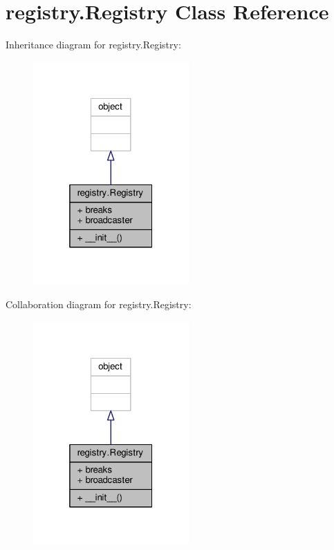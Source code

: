 \hypertarget{classregistry_1_1Registry}{}\section{registry.\+Registry Class Reference}
\label{classregistry_1_1Registry}


Inheritance diagram for registry.\+Registry\+:\nopagebreak
\begin{figure}[H]
\begin{center}
\leavevmode
\includegraphics[width=169pt]{classregistry_1_1Registry__inherit__graph}
\end{center}
\end{figure}


Collaboration diagram for registry.\+Registry\+:\nopagebreak
\begin{figure}[H]
\begin{center}
\leavevmode
\includegraphics[width=169pt]{classregistry_1_1Registry__coll__graph}
\end{center}
\end{figure}
